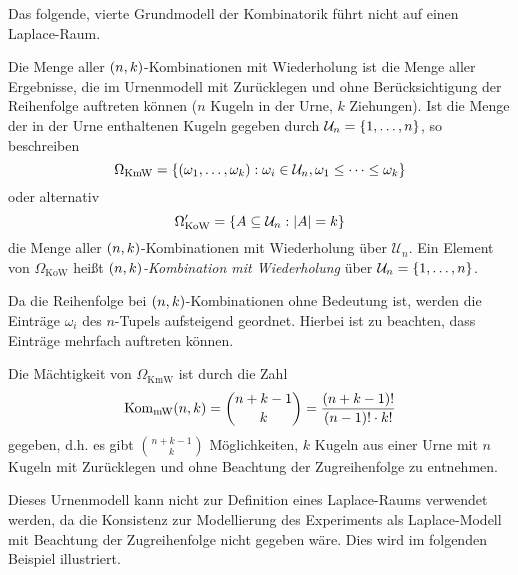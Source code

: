 \documentclass{lecture}
\begin{document}
    Das folgende, vierte Grundmodell der Kombinatorik führt nicht auf einen Laplace-Raum.

    \begin{definition}
        Die Menge aller \(\parentheses*{n, k}\)-Kombinationen mit Wiederholung ist die Menge aller Ergebnisse, die im Urnenmodell mit Zurücklegen und ohne Berücksichtigung der Reihenfolge auftreten können (\(n\) Kugeln in der Urne, \(k\) Ziehungen).
        Ist die Menge der in der Urne enthaltenen Kugeln gegeben durch \(\mathcal{U}_n = \braces*{1, \ldots, n}\), so beschreiben
        \[
            \Omega_{\text{KmW}} = \braces*{\parentheses*{\omega_1, \ldots, \omega_k} : \omega_i \in \mathcal{U}_n, \omega_1 \le \cdots \le \omega_k}
        \]
        oder alternativ
        \[
            \Omega_{\text{KoW}}' = \braces*{A \subseteq \mathcal{U}_n : \absolute*{A} = k}
        \]
        die Menge aller \(\parentheses*{n, k}\)-Kombinationen mit Wiederholung über \(\mathcal{U}_n\).
        Ein Element von \(\Omega_{\text{KoW}}\) heißt \emph{\(\parentheses*{n, k}\)-Kombination mit Wiederholung} über \(\mathcal{U}_n = \braces*{1, \ldots, n}\).
    \end{definition}

    Da die Reihenfolge bei \(\parentheses*{n, k}\)-Kombinationen ohne Bedeutung ist, werden die Einträge \(\omega_i\) des \(n\)-Tupels aufsteigend geordnet.
    Hierbei ist zu beachten, dass Einträge mehrfach auftreten können.

    Die Mächtigkeit von \(\Omega_{\text{KmW}}\) ist durch die Zahl
    \[
        \Kom_{\text{mW}}\parentheses*{n, k} = \binom{n + k - 1}{k} = \frac{\parentheses*{n + k - 1}!}{\parentheses*{n - 1}! \cdot k!}
    \]
    gegeben, d.h. es gibt \(\binom{n + k - 1}{k}\) Möglichkeiten, \(k\) Kugeln aus einer Urne mit \(n\) Kugeln mit Zurücklegen und ohne Beachtung der Zugreihenfolge zu entnehmen.

    Dieses Urnenmodell kann nicht zur Definition eines Laplace-Raums verwendet werden, da die Konsistenz zur Modellierung des Experiments als Laplace-Modell mit Beachtung der Zugreihenfolge nicht gegeben wäre.
    Dies wird im folgenden Beispiel illustriert.
\end{document}
